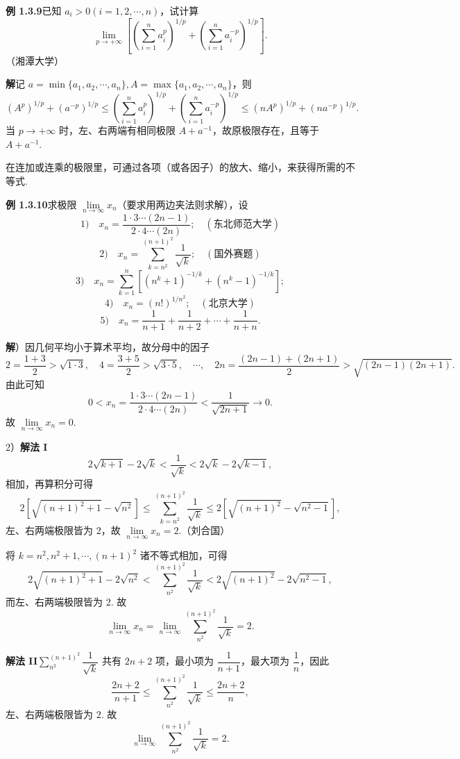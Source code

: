 \documentclass[UTF8,12pt,a4paper,fontset=fandol]{ctexart}
\begin{document}
\noindent\textbf{例 1.3.9}\quad 已知 $a_i>0(i=1,2,\cdots,n)$，试计算
\[
  \lim_{p\to+\infty}\left[\left(\sum_{i=1}^n a_i^p\right)^{1/p}
  +\left(\sum_{i=1}^n a_i^{-p}\right)^{1/p}\right].
\]
（湘潭大学）

\noindent\textbf{解}\quad 记 $a=\min\{a_1,a_2,\cdots,a_n\},A=\max\{a_1,a_2,\cdots,a_n\}$，则
\[
  (A^p)^{1/p}+(a^{-p})^{1/p}
  \le \left(\sum_{i=1}^n a_i^p\right)^{1/p}
  +\left(\sum_{i=1}^n a_i^{-p}\right)^{1/p}
  \le (nA^p)^{1/p}+(na^{-p})^{1/p}.
\]
当 $p\to+\infty$ 时，左、右两端有相同极限 $A+a^{-1}$，故原极限存在，且等于 $A+a^{-1}$.

在连加或连乘的极限里，可通过各项（或各因子）的放大、缩小，来获得所需的不等式.

\noindent\textbf{例 1.3.10}\quad 求极限 $\lim\limits_{n\to\infty}x_n$（要求用两边夹法则求解），设
\[
1)\quad x_n=\frac{1\cdot3\cdots(2n-1)}{2\cdot4\cdots(2n)};\quad(\text{东北师范大学})
\]
\[
2)\quad x_n=\sum_{k=n^2}^{(n+1)^2}\frac1{\sqrt k};\quad(\text{国外赛题})
\]
\[
3)\quad x_n=\sum_{k=1}^n\left[(n^k+1)^{-1/k}+(n^k-1)^{-1/k}\right];
\]
\[
4)\quad x_n=(n!)^{1/n^2};\quad(\text{北京大学})
\]
\[
5)\quad x_n=\frac1{n+1}+\frac1{n+2}+\cdots+\frac1{n+n}.
\]

\noindent\textbf{解}）因几何平均小于算术平均，故分母中的因子
\[
2=\frac{1+3}{2}>\sqrt{1\cdot3},\quad
4=\frac{3+5}{2}>\sqrt{3\cdot5},\quad\cdots,\quad
2n=\frac{(2n-1)+(2n+1)}2>\sqrt{(2n-1)(2n+1)}.
\]
由此可知
\[
  0<x_n=\frac{1\cdot3\cdots(2n-1)}{2\cdot4\cdots(2n)}
  <\frac1{\sqrt{2n+1}}\to0.
\]
故 $\lim\limits_{n\to\infty}x_n=0$.

2）\textbf{解法 I}\quad
\[
  2\sqrt{k+1}-2\sqrt k<\frac1{\sqrt k}<2\sqrt k-2\sqrt{k-1},
\]
相加，再算积分可得
\[
  2\left[\sqrt{(n+1)^2+1}-\sqrt{n^2}\right]
  \le \sum_{k=n^2}^{(n+1)^2}\frac1{\sqrt k}
  \le 2\left[\sqrt{(n+1)^2}-\sqrt{n^2-1}\right],
\]
左、右两端极限皆为 $2$，故 $\lim\limits_{n\to\infty}x_n=2$.（刘合国）

将 $k=n^2,n^2+1,\cdots,(n+1)^2$ 诸不等式相加，可得
\[
2\sqrt{(n+1)^2+1}-2\sqrt{n^2}
<\sum_{n^2}^{(n+1)^2}\frac1{\sqrt k}
<2\sqrt{(n+1)^2}-2\sqrt{n^2-1},
\]
而左、右两端极限皆为 $2$. 故
\[
  \lim_{n\to\infty}x_n=\lim_{n\to\infty}\sum_{n^2}^{(n+1)^2}\frac1{\sqrt k}=2.
\]

\noindent\textbf{解法 II}\quad $\sum\limits_{n^2}^{(n+1)^2}\dfrac1{\sqrt k}$ 共有 $2n+2$ 项，最小项为 $\dfrac1{n+1}$，最大项为 $\dfrac1n$，因此
\[
  \frac{2n+2}{n+1}\le\sum_{n^2}^{(n+1)^2}\frac1{\sqrt k}\le\frac{2n+2}{n},
\]
左、右两端极限皆为 $2$. 故
\[
  \lim_{n\to\infty}\sum_{n^2}^{(n+1)^2}\frac1{\sqrt k}=2.
\]
\end{document}
